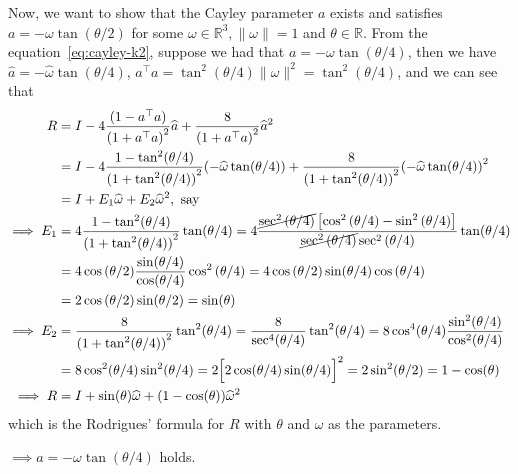 \clearpage
Now, we want to show that the Cayley parameter \( a \) exists and satisfies \( a = -\omega \tan(\theta / 2) \) for some \( \omega \in \mathbb{R}^{3}, \| \omega \| = 1 \) and \( \theta \in \mathbb{R} \).
From the equation~\eqref{eq:cayley-k2}, suppose we had that \( a = -\omega \tan(\theta / 4) \), then we have \( \widehat{a} = -\widehat{\omega} \tan(\theta / 4) \), \( a^\top a = \tan^{2}(\theta / 4) \| \omega \|^{2} = \tan^{2}(\theta / 4) \), and we can see that
\begin{align*}
    R
     & =
    I - 4 \frac{(1 - a^{\top} a)}{{(1 + a^{\top} a)}^{2}} \widehat{a} + \frac{8}{{(1 + a^{\top} a)}^{2}} \widehat{a}^{2}
    \\ & =
    I - 4 \frac{1 - \tan^{2}(\theta / 4)}{{(1 + \tan^{2}(\theta / 4))}^{2}}{(-\widehat{\omega} \tan(\theta / 4))} + \frac{8}{{(1 + \tan^{2}(\theta / 4))}^{2}}{(-\widehat{\omega} \tan(\theta / 4))}^{2}
    \\ & =
    I + E_1 \widehat{\omega} + E_2 \widehat{\omega}^{2}, \text{ say}
    \\
    \implies
    E_1
     & =
    4 \frac{1 - \tan^{2}(\theta / 4)}{{(1 + \tan^{2}(\theta / 4))}^{2}} \tan(\theta / 4)
    =
    4
    \frac{ \cancel{\sec^{2}{(\theta / 4)}} \left[ \cos^{2}{(\theta / 4)} - \sin^{2}{(\theta / 4)} \right] }{ \cancel{\sec^{2}{(\theta / 4)}} \sec^{2}{(\theta / 4)} }
    \tan(\theta / 4)
    \\ & =
    4 \cos{(\theta / 2)} \frac{\sin(\theta / 4)}{\cos(\theta / 4)} \cos^{2}{(\theta / 4)}
    =
    4 \cos{(\theta / 2)} \sin(\theta / 4) \cos{(\theta / 4)}
    \\ & =
    2 \cos{(\theta / 2)} \sin(\theta / 2)
    =
    \sin(\theta)
    \\
    \implies
    E_2
     & =
    \frac{8}{{(1 + \tan^{2}(\theta / 4))}^{2}} \tan^{2}(\theta / 4)
    =
    \frac{8}{{\sec^{4}(\theta / 4)}} \tan^{2}(\theta / 4)
    =
    8 \cos^{4}(\theta / 4) \frac{\sin^{2}(\theta / 4)}{\cos^{2}(\theta / 4)}
    \\ & =
    8 \cos^{2}(\theta / 4) \sin^{2}(\theta / 4)
    =
    2 {\Big[ 2 \cos(\theta / 4) \sin(\theta / 4) \Big]}^{2}
    =
    2 \sin^{2}(\theta / 2)
    =
    1 - \cos(\theta)
    \\
    \implies
    R
     & =
    I + \sin(\theta) \widehat{\omega} + (1 - \cos(\theta)) \widehat{\omega}^{2}
\end{align*}
which is the Rodrigues' formula for \( R \) with \( \theta \) and \( \omega \) as the parameters.

\( \implies \boxed{a = -\omega \tan(\theta / 4)} \) holds.
